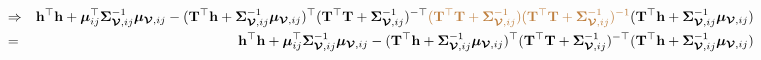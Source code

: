 \documentclass[12pt]{article}
\newcommand{\0}{\mathbf{0}}
\begin{document}
\begin{eqnarray*}
& \Rightarrow & \mathbf{h}^{\top} \mathbf{h} + \boldsymbol{\mu}_{ij}^{\top} \boldsymbol{\Sigma}_{\boldsymbol{\mathcal{V}}, ij}^{-1} \boldsymbol{\mu}_{\boldsymbol{\mathcal{V}}, ij} - ( \mathbf{T}^{\top} \mathbf{h} + \boldsymbol{\Sigma}_{\boldsymbol{\mathcal{V}}, ij}^{-1}\boldsymbol{\mu}_{\boldsymbol{\mathcal{V}}, ij} )^{\top} ( \mathbf{T}^{\top} \mathbf{T} + \boldsymbol{\Sigma}_{\boldsymbol{\mathcal{V}}, ij}^{-1} )^{- \top} \textcolor{brown}{ ( \mathbf{T}^{\top} \mathbf{T} + \boldsymbol{\Sigma}_{\boldsymbol{\mathcal{V}}, ij}^{-1} ) ( \mathbf{T}^{\top} \mathbf{T} + \boldsymbol{\Sigma}_{\boldsymbol{\mathcal{V}}, ij}^{-1} )^{-1} } ( \mathbf{T}^{\top} \mathbf{h} + \boldsymbol{\Sigma}_{\boldsymbol{\mathcal{V}}, ij}^{-1}\boldsymbol{\mu}_{\boldsymbol{\mathcal{V}}, ij} ) \\
& = & \mathbf{h}^{\top} \mathbf{h} + \boldsymbol{\mu}_{ij}^{\top} \boldsymbol{\Sigma}_{\boldsymbol{\mathcal{V}}, ij}^{-1} \boldsymbol{\mu}_{\boldsymbol{\mathcal{V}}, ij} - ( \mathbf{T}^{\top} \mathbf{h} + \boldsymbol{\Sigma}_{\boldsymbol{\mathcal{V}}, ij}^{-1}\boldsymbol{\mu}_{\boldsymbol{\mathcal{V}}, ij} )^{\top} ( \mathbf{T}^{\top} \mathbf{T} + \boldsymbol{\Sigma}_{\boldsymbol{\mathcal{V}}, ij}^{-1} )^{-\top} ( \mathbf{T}^{\top} \mathbf{h} + \boldsymbol{\Sigma}_{\boldsymbol{\mathcal{V}}, ij}^{-1}\boldsymbol{\mu}_{\boldsymbol{\mathcal{V}}, ij} )
\end{eqnarray*}
\end{document}
